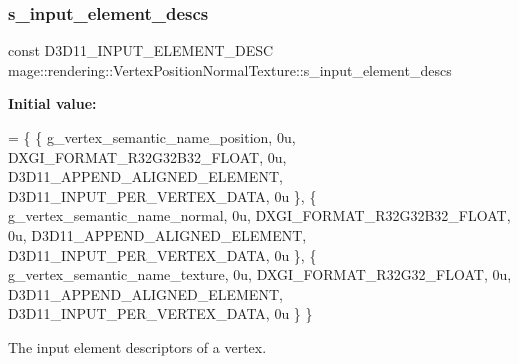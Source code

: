 \subsubsection{\texorpdfstring{s\+\_\+input\+\_\+element\+\_\+descs}{s\_input\_element\_descs}}
{\footnotesize\ttfamily const D3\+D11\+\_\+\+I\+N\+P\+U\+T\+\_\+\+E\+L\+E\+M\+E\+N\+T\+\_\+\+D\+E\+SC mage\+::rendering\+::\+Vertex\+Position\+Normal\+Texture\+::s\+\_\+input\+\_\+element\+\_\+descs\hspace{0.3cm}{\ttfamily [static]}}

{\bfseries Initial value\+:}
\begin{DoxyCode}
= \{
        \{ g\_vertex\_semantic\_name\_position, 0u, DXGI\_FORMAT\_R32G32B32\_FLOAT,    0u, 
      D3D11\_APPEND\_ALIGNED\_ELEMENT, D3D11\_INPUT\_PER\_VERTEX\_DATA, 0u \},
        \{ g\_vertex\_semantic\_name\_normal,   0u, DXGI\_FORMAT\_R32G32B32\_FLOAT,    0u, 
      D3D11\_APPEND\_ALIGNED\_ELEMENT, D3D11\_INPUT\_PER\_VERTEX\_DATA, 0u \},
        \{ g\_vertex\_semantic\_name\_texture,  0u, DXGI\_FORMAT\_R32G32\_FLOAT,       0u, 
      D3D11\_APPEND\_ALIGNED\_ELEMENT, D3D11\_INPUT\_PER\_VERTEX\_DATA, 0u \}
    \}
\end{DoxyCode}
The input element descriptors of a vertex. 